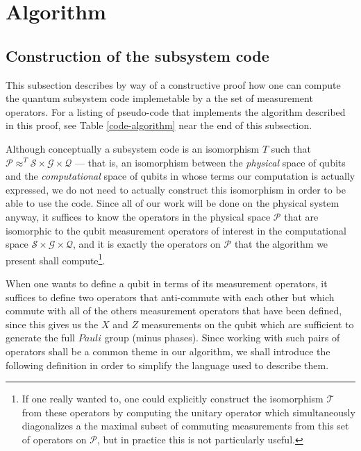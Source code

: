 \documentclass[twocolumn,showpacs,preprintnumbers,amsmath,amssymb,nofootinbib,pra,floatfix]{revtex4-1}
\newenvironment{remark}[1][Remark]{\begin{trivlist}
\item[\hskip \labelsep {\bfseries #1}]}{\end{trivlist}}
\begin{document}
\section{Algorithm}

\subsection{Construction of the subsystem code}

\begin{remark}
This subsection describes by way of a constructive proof how one can compute the quantum subsystem code implemetable by a the set of measurement operators.  For a listing of pseudo-code that implements the algorithm described in this proof, see Table \ref{code-algorithm} near the end of this subsection.
\end{remark}
Although conceptually a subsystem code is an isomorphism $T$ such that  $\mathscr{P}\approx^T \mathscr{S}\times\mathscr{G}\times\mathscr{Q}$ --- that is, an isomorphism between the \emph{physical} space of qubits and the \emph{computational} space of qubits in whose terms our computation is actually expressed, we do not need to actually construct this isomorphism in order to be able to use the code.  Since all of our work will be done on the physical system anyway, it suffices to know the operators in the physical space $\mathscr{P}$ that are isomorphic to the qubit measurement operators of interest in the computational space $\mathscr{S}\times\mathscr{G}\times\mathscr{Q}$, and it is exactly the operators on $\mathscr{P}$ that the algorithm we present shall compute\footnote{If one really wanted to, one could explicitly construct the isomorphism $\mathscr{T}$ from these operators by computing the unitary operator which simultaneously diagonalizes a the maximal subset of commuting measurements from this set of operators on $\mathscr{P}$, but in practice this is not particularly useful.}.

When one wants to define a qubit in terms of its measurement operators, it suffices to define two operators that anti-commute with each other but which commute with all of the others measurement operators that have been defined, since this gives us the $X$ and $Z$ measurements on the qubit which are sufficient to generate the full $Pauli$ group (minus phases).  Since working with such pairs of operators shall be a common theme in our algorithm, we shall introduce the following definition in order to simplify the language used to describe them.
\end{document}
